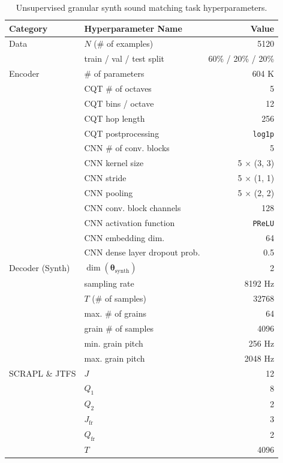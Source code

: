 \documentclass{article} %
\theoremstyle{plain}
\theoremstyle{definition}
\theoremstyle{remark}
\begin{document}
\begin{table}[H]
\centering
\caption{Unsupervised granular synth sound matching task hyperparameters.}
\label{tab:granular_hyperparams}
\vspace{3pt}
\begin{tabular}{
    llr
}
    \toprule
    \bf{Category} & \bf{Hyperparameter Name} & \bf{Value} \\
    \midrule
    Data & $N$ (\# of examples) & 5120 \\
    & train / val / test split & 60\% / 20\% / 20\% \\
    \midrule
    Encoder & \# of parameters & 604 K \\
    & CQT \# of octaves & 5 \\
    & CQT bins / octave & 12 \\
    & CQT hop length & 256 \\
    & CQT postprocessing & \texttt{log1p} \\
    & CNN \# of conv. blocks & 5 \\
    & CNN kernel size & 5 $\times$ (3, 3) \\
    & CNN stride & 5 $\times$ (1, 1) \\
    & CNN pooling & 5 $\times$ (2, 2) \\
    & CNN conv. block channels & 128 \\
    & CNN activation function & \texttt{PReLU} \\
    & CNN embedding dim. & 64 \\
    & CNN dense layer dropout prob. & 0.5 \\
    \midrule
    Decoder (Synth) & $\dim(\boldsymbol{\theta_{\mathrm{synth}}})$ & 2 \\
    & sampling rate & 8192 Hz \\
    & $T$ (\# of samples) & 32768 \\
    & max. \# of grains & 64 \\
    & grain \# of samples & 4096 \\
    & min. grain pitch & 256 Hz \\
    & max. grain pitch & 2048 Hz \\
    \midrule
    SCRAPL \& JTFS & $J$ & 12 \\
    & $Q_1$ & 8 \\
    & $Q_2$ & 2 \\
    & $J_{\mathrm{fr}}$ & 3 \\
    & $Q_{\mathrm{fr}}$ & 2 \\
    & $T$ & 4096 \\

\end{tabular}
\end{table}
\end{document}
